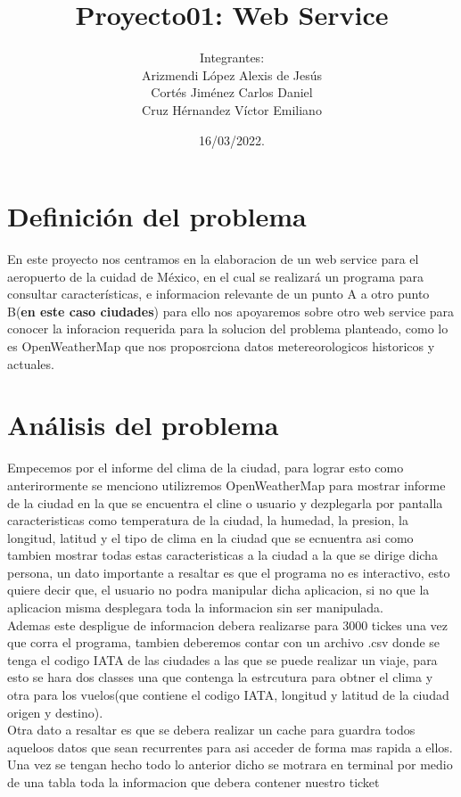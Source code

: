 \documentclass[30pt]{article}
\title{Proyecto01: Web Service}
\author{Integrantes:\\
    Arizmendi López Alexis de Jesús\\
    Cortés Jiménez Carlos Daniel\\
    Cruz Hérnandez Víctor Emiliano}
\date{16/03/2022.}
\theoremstyle{definition}
\begin{document}
\maketitle

\section{\LARGE Definición del problema}

{\large En este proyecto nos centramos en la elaboracion de un web service para el aeropuerto de la cuidad de México, en el cual se realizará un programa para consultar características, e informacion relevante de un punto A a otro punto B(\textbf{en este caso ciudades}) para ello nos apoyaremos sobre otro web service para conocer la inforacion requerida para la solucion del problema planteado, como lo es OpenWeatherMap que nos proposrciona datos metereorologicos historicos y actuales.} 


\section{Análisis del problema}

{\large Empecemos por el informe del clima de la ciudad, para lograr esto como anterirormente se menciono utilizremos OpenWeatherMap para mostrar informe de la ciudad en la que se encuentra el cline o usuario y dezplegarla por pantalla caracteristicas como temperatura de la ciudad, la humedad, la presion, la longitud, latitud y el tipo de clima en la ciudad que se ecnuentra asi como tambien mostrar todas estas caracteristicas a la ciudad a la que se dirige dicha persona, un dato importante a resaltar es que el programa no es interactivo, esto quiere decir que, el usuario no podra manipular dicha aplicacion, si no que la aplicacion misma desplegara toda la informacion sin ser manipulada.\\
Ademas este despligue de informacion debera realizarse para 3000 tickes una vez que corra el programa, tambien deberemos contar con un archivo .csv donde se tenga el codigo IATA de las ciudades a las que se puede realizar un viaje, para esto se hara dos classes una que contenga la estrcutura para obtner el clima y otra para los vuelos(que contiene el codigo IATA, longitud y latitud de la ciudad origen y destino).\\
Otra dato a resaltar es que se debera realizar un cache para guardra todos aqueloos datos que sean recurrentes para asi acceder de forma mas rapida a ellos.
Una vez se tengan hecho todo lo anterior dicho se motrara en terminal por medio de una tabla toda la informacion que debera contener nuestro ticket} 
\end{document}
